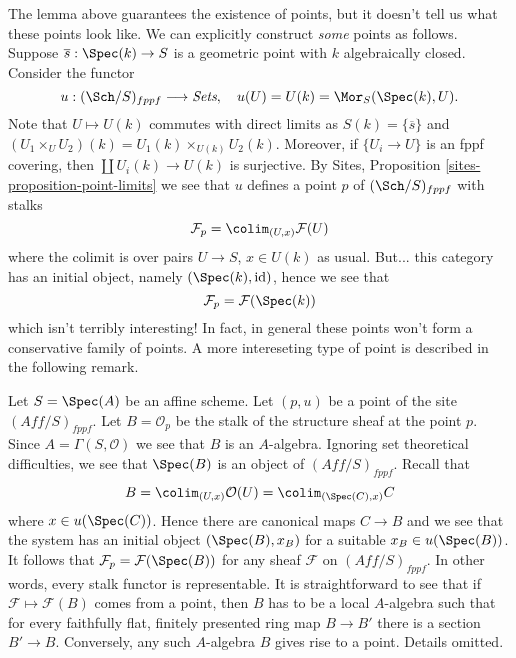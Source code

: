 \noindent
The lemma above guarantees the existence of points, but it doesn't
tell us what these points look like. We can explicitly construct
{\it some} points as follows.
Suppose $\overline{s} : \Spec(k) \to S$ is a geometric
point with $k$ algebraically closed. Consider the functor
$$
u : (\Sch/S)_{fppf} \longrightarrow \textit{Sets},
\quad
u(U) = U(k) = \Mor_S(\Spec(k), U).
$$
Note that $U \mapsto U(k)$ commutes with direct limits as
$S(k) = \{\overline{s}\}$ and
$(U_1 \times_U U_2)(k) = U_1(k) \times_{U(k)} U_2(k)$.
Moreover, if $\{U_i \to U\}$ is an fppf covering, then
$\coprod U_i(k) \to U(k)$ is surjective.
By
Sites, Proposition \ref{sites-proposition-point-limits}
we see that $u$ defines a point $p$ of $(\Sch/S)_{fppf}$ with
stalks
$$
\mathcal{F}_p = \colim_{(U, x)} \mathcal{F}(U)
$$
where the colimit is over pairs $U \to S$, $x \in U(k)$ as usual.
But... this category has an initial object, namely
$(\Spec(k), \text{id})$, hence we see that
$$
\mathcal{F}_p = \mathcal{F}(\Spec(k))
$$
which isn't terribly interesting! In fact, in general these points won't
form a conservative family of points. A more intereseting type of point
is described in the following remark.

\begin{remark}
\label{remark-points-fppf-site}
Let $S = \Spec(A)$ be an affine scheme. Let $(p, u)$ be a point of
the site $(\textit{Aff}/S)_{fppf}$. Let $B = \mathcal{O}_p$ be the stalk
of the structure sheaf at the point $p$. Since $A = \Gamma(S, \mathcal{O})$
we see that $B$ is an $A$-algebra. Ignoring set theoretical difficulties, we
see that $\Spec(B)$ is an object of $(\textit{Aff}/S)_{fppf}$. Recall
that
$$
B = \colim_{(U, x)} \mathcal{O}(U) =
\colim_{(\Spec(C), x)} C
$$
where $x \in u(\Spec(C))$. Hence there are canonical maps $C \to B$
and we see that the system has an initial object $(\Spec(B), x_B)$
for a suitable $x_B \in u(\Spec(B))$. It follows that
$\mathcal{F}_p = \mathcal{F}(\Spec(B))$ for any sheaf $\mathcal{F}$
on $(\textit{Aff}/S)_{fppf}$. In other words, every stalk functor
is representable. It is straightforward to see that if
$\mathcal{F} \mapsto \mathcal{F}(B)$ comes from a point, then
$B$ has to be a local $A$-algebra such that for every faithfully flat,
finitely presented ring map $B \to B'$ there is a section $B' \to B$.
Conversely, any such $A$-algebra $B$ gives rise to a point.
Details omitted.
\end{remark}











